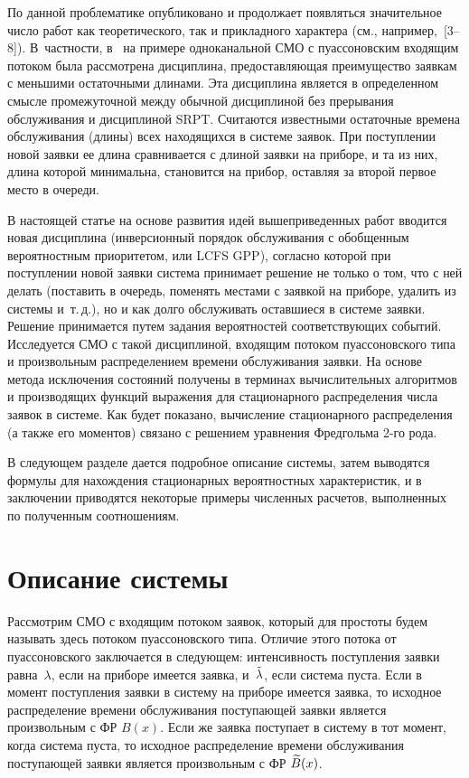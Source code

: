 \begin{multicols}{2}
По данной проблематике опубликовано и продолжает
появляться значительное число работ как
теоретического, так и прикладного характера
(см., например,~[3--8]).
В~частности, в~\cite{aaa2} на примере одноканальной
СМО с пуассоновским входящим потоком была рассмотрена
дисциплина, предо\-став\-ля\-ющая преимущество заявкам с
меньшими остаточными длинами.
Эта дисциплина является в определенном смысле
промежуточной между обычной дисциплиной без
прерывания обслуживания и дисциплиной {SRPT}.
Считаются известными
остаточные времена обслуживания (длины) всех
находящихся в системе заявок.
При поступлении новой заявки ее длина сравнивается
с длиной заявки на приборе, и та из них, длина
которой минимальна, становится на
прибор, оставляя за второй первое место в очереди.


В настоящей статье на основе развития идей
вышеприведенных работ вводится новая дисциплина
(инверсионный порядок обслуживания с обобщенным
вероятностным приоритетом, или LCFS GPP),
согласно которой при поступлении новой заявки система
принимает решение не только о том, что с ней делать
(поставить в очередь, поменять местами с заявкой
на приборе, удалить из системы и~т.\,д.), но и
как долго обслуживать оставшиеся в системе заявки.
Решение принимается путем задания вероятностей
соответствующих событий.
Исследуется СМО с такой дисциплиной, входящим потоком
пуассоновского типа и произвольным распределением
времени обслуживания заявки.
На основе метода исключения состояний получены
в терминах вычислительных алгоритмов и
производящих функций выражения для стационарного
распределения числа заявок в системе.
Как будет показано, вычисление стационарного
распределения (а также его моментов) связано с
решением уравнения Фредгольма 2-го рода.

В следующем разделе дается подробное опи\-сание
системы,
затем выводятся формулы для нахожде\-ния стационарных
вероятностных характеристик, и в заключении
приводятся некоторые примеры численных расчетов,
выполненных по полученным соотношениям.

\section{Описание системы}

Рассмотрим СМО с входящим потоком заявок,
который для простоты будем называть здесь
потоком пуассоновского типа.
Отличие этого потока от пуассоновского
заключается в следующем:
интенсивность поступления заявки равна~$\lambda$,
если на приборе имеется заявка, и~$\tilde\lambda$, если
система пуста.
Если в момент поступления заявки в систему
на приборе имеется заявка, то исходное
распределение времени обслуживания поступающей
заявки является произвольным с ФР $B(x)$.
Если же заявка поступает в систему в тот
момент, когда система пуста, то исходное
распределение времени обслуживания поступающей
заявки является произвольным с ФР $\widetilde B(x)$.


\end{multicols}
